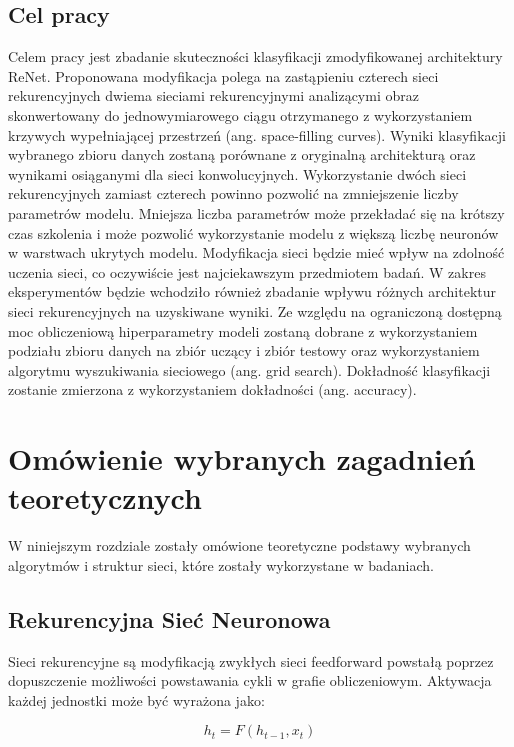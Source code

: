 \documentclass[oneside, mag]{mgr}
\begin{document}
\section{Cel pracy}

Celem pracy jest zbadanie skuteczności klasyfikacji zmodyfikowanej architektury ReNet. Proponowana modyfikacja polega na zastąpieniu czterech sieci rekurencyjnych dwiema sieciami rekurencyjnymi analizącymi obraz skonwertowany do jednowymiarowego ciągu otrzymanego z wykorzystaniem krzywych wypełniającej przestrzeń (ang. space-filling curves). Wyniki klasyfikacji wybranego zbioru danych zostaną porównane z oryginalną architekturą oraz wynikami osiąganymi dla sieci konwolucyjnych. Wykorzystanie dwóch sieci rekurencyjnych zamiast czterech powinno pozwolić na zmniejszenie liczby parametrów modelu. Mniejsza liczba parametrów może przekładać się na krótszy czas szkolenia i może pozwolić wykorzystanie modelu z większą liczbę neuronów w warstwach ukrytych modelu. Modyfikacja sieci będzie mieć wpływ na zdolność uczenia sieci, co oczywiście jest najciekawszym przedmiotem badań. W zakres eksperymentów będzie wchodziło również zbadanie wpływu różnych architektur sieci rekurencyjnych na uzyskiwane wyniki. Ze względu na ograniczoną dostępną moc obliczeniową hiperparametry modeli zostaną dobrane z wykorzystaniem podziału zbioru danych na zbiór uczący i zbiór testowy oraz wykorzystaniem algorytmu wyszukiwania sieciowego (ang. grid search). Dokładność klasyfikacji zostanie zmierzona z wykorzystaniem dokładności (ang. accuracy).




\chapter{Omówienie wybranych zagadnień teoretycznych}

W niniejszym rozdziale zostały omówione teoretyczne podstawy wybranych algorytmów i struktur sieci, które zostały wykorzystane w badaniach.

\section{Rekurencyjna Sieć Neuronowa}

Sieci rekurencyjne są modyfikacją zwykłych sieci feedforward powstałą poprzez dopuszczenie możliwości powstawania cykli w grafie obliczeniowym. Aktywacja każdej jednostki może być wyrażona jako:


\begin{equation}
	h_t = F(h_{t-1}, x_t)
	\label{eq:basic-rnn}
\end{equation}
\end{document}
